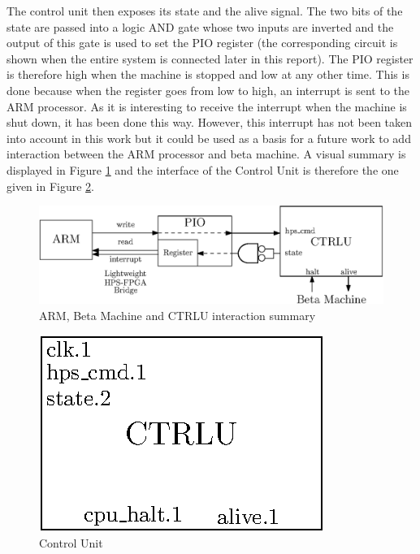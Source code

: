 The control unit then exposes its state and the alive signal. The two bits of the state are passed 
into a logic AND gate whose two inputs are inverted and the output of this gate is used to set the 
PIO register (the corresponding circuit is shown when the entire system is connected later in this 
report). The PIO register is  therefore high when the machine is stopped and low at any other time. 
This is done because when the register goes from low to high, an interrupt is sent to the ARM 
processor. As it is interesting to receive the interrupt when the machine is shut down, it has been 
done this way. However, this interrupt has not been taken into account in this work but it could be 
used as a basis for a future work to add interaction between the ARM processor and beta machine. 
A visual summary is displayed in Figure \ref{fig:ctrlu/summary} and the interface of the Control 
Unit is therefore the one given in Figure \ref{fig:ctrlu}.

\begin{figure}[ht!]
    \center
    \includegraphics[scale=0.8]{"Chapter6-MAU_CTRLU/res/ctrlu_summary"}
    \caption{ARM, Beta Machine and CTRLU interaction summary}
    \label{fig:ctrlu/summary}
\end{figure}

\begin{figure}[ht!]
    \center
    \includegraphics[scale=0.8]{"Chapter6-MAU_CTRLU/res/ctrlu"}
    \caption{Control Unit}
    \label{fig:ctrlu}
\end{figure}